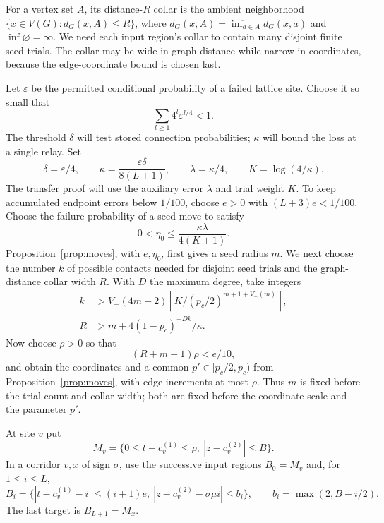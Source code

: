 \documentclass[11pt]{article}
\theoremstyle{definition}
\newcommand{\pc}{p_c}
\begin{document}
For a vertex set $A$, its distance-$R$ collar is the ambient
neighborhood $\{x\in V(G):d_G(x,A)\le R\}$, where
$d_G(x,A)=\inf_{a\in A}d_G(x,a)$ and $\inf\varnothing=\infty$.
We need each input region's collar to contain many disjoint finite
seed trials. The collar may be wide in graph distance while narrow in
coordinates, because the edge-coordinate bound is chosen last.

Let $\varepsilon$ be the permitted conditional probability of a failed
lattice site. Choose it so small that
\begin{equation}\label{eq:directed-contour-series}
 \sum_{l\ge1}4^l\varepsilon^{l/4}<1.
\end{equation}
The threshold $\delta$ will test stored connection probabilities;
$\kappa$ will bound the loss at a single relay. Set
\[
 \delta=\varepsilon/4,\qquad
 \kappa=\frac{\varepsilon\delta}{8(L+1)},\qquad
 \lambda=\kappa/4,\qquad K=\log(4/\kappa).
\]
The transfer proof will use the auxiliary error $\lambda$ and trial
weight $K$. To keep accumulated endpoint errors below $1/100$, choose
$e>0$ with $(L+3)e<1/100$. Choose the failure probability of a seed
move to satisfy
\[
 0<\eta_0\le\frac{\kappa\lambda}{4(K+1)}.
\]
Proposition~\ref{prop:moves}, with $e,\eta_0$, first gives a seed
radius $m$. We next choose the number $k$ of possible contacts needed
for disjoint seed trials and the graph-distance collar width $R$.
With $D$ the maximum degree, take integers
\begin{equation}\label{eq:corridor-trial-scales}
 \begin{split}
 k&>V_+(4m+2)
       \left\lceil K/(\pc/2)^{m+1+V_+(m)}\right\rceil,\\
 R&>m+4(1-\pc)^{-Dk}/\kappa.
 \end{split}
\end{equation}
Now choose $\rho>0$ so that
\begin{equation}\label{eq:corridor-coordinate-step}
 (R+m+1)\rho<e/10,
\end{equation}
and obtain the coordinates and a common $p'\in[\pc/2,\pc)$ from
Proposition~\ref{prop:moves}, with edge increments at most $\rho$.
Thus $m$ is fixed before the trial count and collar width; both are
fixed before the coordinate scale and the parameter $p'$.

At site $v$ put
\[
 M_v=\{0\le t-c_v^{(1)}\le\rho,\
                   |z-c_v^{(2)}|\le B\}.
\]
In a corridor $v,x$ of sign $\sigma$, use the successive input regions
$B_0=M_v$ and, for $1\le i\le L$,
\begin{equation}\label{eq:relay-regions}
 B_i=\{|t-c_v^{(1)}-i|\le(i+1)e,\
 |z-c_v^{(2)}-\sigma\mu i|\le b_i\},
 \qquad b_i=\max(2,B-i/2).
\end{equation}
The last target is $B_{L+1}=M_x$.
\end{document}
